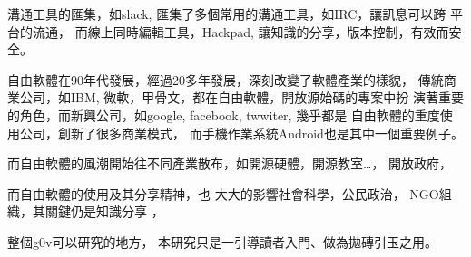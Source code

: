 溝通工具的匯集，如slack, 匯集了多個常用的溝通工具，如IRC，讓訊息可以跨
平台的流通，
而線上同時編輯工具，Hackpad, 讓知識的分享，版本控制，有效而安全。




自由軟體在90年代發展，經過20多年發展，深刻改變了軟體產業的樣貌，
傳統商業公司，如IBM, 微軟，甲骨文，都在自由軟體，開放源始碼的專案中扮
演著重要的角色，而新興公司，如google, facebook, twwiter, 幾乎都是
自由軟體的重度使用公司，創新了很多商業模式，
而手機作業系統Android也是其中一個重要例子。


而自由軟體的風潮開始往不同產業散布，如開源硬體，開源教室…，
開放政府，


而自由軟體的使用及其分享精神，也
大大的影響社會科學，公民政治，
NGO組織，其關鍵仍是知識分享 ，


整個g0v可以研究的地方，
本研究只是一引導讀者入門、做為拋磚引玉之用。






\EndChapter
